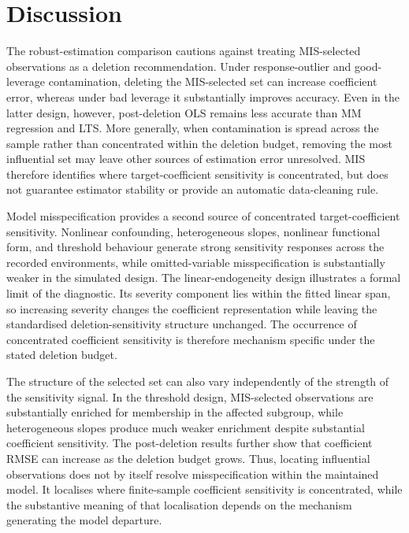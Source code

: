 \documentclass[../main.tex]{subfiles}
\begin{document}
\section{Discussion}
\label{sec:discussion}

The robust-estimation comparison cautions against treating MIS-selected observations as a deletion recommendation. Under response-outlier and good-leverage contamination, deleting the MIS-selected set can increase coefficient error, whereas under bad leverage it substantially improves accuracy. Even in the latter design, however, post-deletion OLS remains less accurate than MM regression and LTS. More generally, when contamination is spread across the sample rather than concentrated within the deletion budget, removing the most influential set may leave other sources of estimation error unresolved. MIS therefore identifies where target-coefficient sensitivity is concentrated, but does not guarantee estimator stability or provide an automatic data-cleaning rule.

Model misspecification provides a second source of concentrated target-coefficient sensitivity. Nonlinear confounding, heterogeneous slopes, nonlinear functional form, and threshold behaviour generate strong sensitivity responses across the recorded environments, while omitted-variable misspecification is substantially weaker in the simulated design. The linear-endogeneity design illustrates a formal limit of the diagnostic. Its severity component lies within the fitted linear span, so increasing severity changes the coefficient representation while leaving the standardised deletion-sensitivity structure unchanged. The occurrence of concentrated coefficient sensitivity is therefore mechanism specific under the stated deletion budget.

The structure of the selected set can also vary independently of the strength of the sensitivity signal. In the threshold design, MIS-selected observations are substantially enriched for membership in the affected subgroup, while heterogeneous slopes produce much weaker enrichment despite substantial coefficient sensitivity. The post-deletion results further show that coefficient RMSE can increase as the deletion budget grows. Thus, locating influential observations does not by itself resolve misspecification within the maintained model. It localises where finite-sample coefficient sensitivity is concentrated, while the substantive meaning of that localisation depends on the mechanism generating the model departure.
\end{document}
